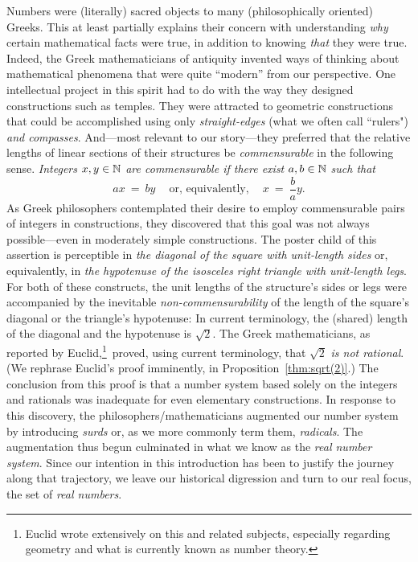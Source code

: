 Numbers were (literally) sacred objects to many (philosophically oriented) Greeks.  This at least partially explains their concern with understanding {\em why} certain mathematical facts were true, in addition to knowing {\em that} they were true.  Indeed, the Greek mathematicians of antiquity invented ways of thinking about mathematical phenomena that were quite ``modern'' from our perspective.  One intellectual project in this spirit had to do with the way they designed constructions such as temples.  They were attracted to geometric constructions that could be
accomplished using only {\em straight-edges} (what we often call ``rulers") {\em and compasses}.  And---most relevant to our story---they preferred that the relative lengths of linear sections of their structures be {\em commensurable} in the following sense.  {\em Integers $x,y \in \mathbb{N}$ are {\em commensurable} if there exist $a, b \in \mathbb{N}$ such that}
\[ 
ax \ = \ by \ \ \ \ \mbox{ or, equivalently, } \ \ \ \ x \ = \ \frac{b}{a} y.
\]
As Greek philosophers contemplated their desire to employ commensurable pairs of integers in constructions, they discovered that this goal was not always possible---even in moderately simple constructions.  The poster child of this assertion is perceptible in {\it the diagonal of the square with unit-length sides} or, equivalently, in {\it the hypotenuse of the isosceles right triangle with unit-length legs}.  For both of these constructs, the unit lengths of the structure's sides or legs were accompanied by the inevitable {\em non-commensurability} of the length of the square's diagonal or the triangle's hypotenuse: In current terminology, the (shared) length of the diagonal and the hypotenuse is $\sqrt{2}$.  The Greek mathematicians, as reported by Euclid,\footnote{Euclid wrote extensively on this and related subjects, especially regarding geometry and what is currently known as number theory.}~proved, using current terminology, that $\sqrt{2}$ {\em is not rational}.  (We rephrase Euclid's proof imminently, in Proposition~\ref{thm:sqrt(2)}.)  The conclusion from this proof is that a number system based solely on the integers and rationals was inadequate for even elementary constructions.  In response to this discovery, the philosophers/mathematicians augmented our number system by introducing {\it surds} or, as we more commonly term them, {\it radicals}.  The augmentation thus begun culminated in what we know as the {\it real number system}.  Since our intention in this introduction has been to justify the journey along that trajectory, we leave our historical digression and turn to our real focus, the set of {\it real numbers}.
   

